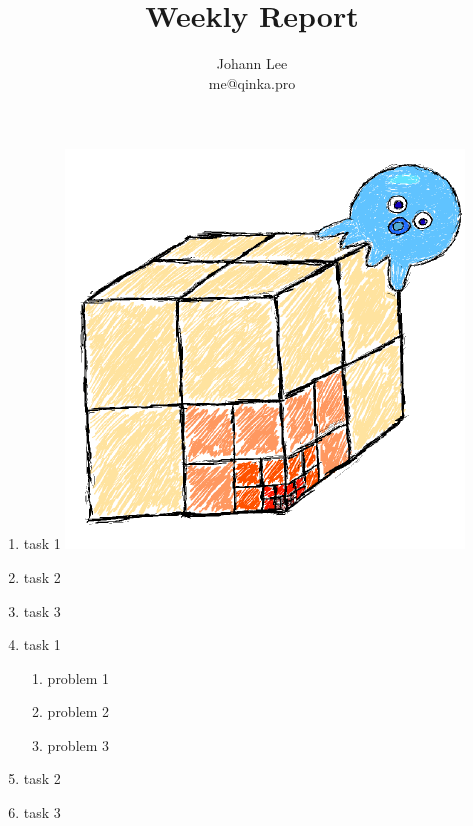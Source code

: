 \documentclass[chinese]{working}
\title{Weekly Report}
\author{Johann Lee \\ me@qinka.pro}
\begin{document}
    \maketitle
    \task
        \begin{enumerate}
            \item task 1
            \includegraphics{qinka}
            \item task 2
            \item task 3
            \item task 1
              \begin{enumerate}
              \item problem 1
              \item problem 2
              \item problem 3
              \end{enumerate}
            \item task 2
            \item task 3
        \end{enumerate}
\end{document}
